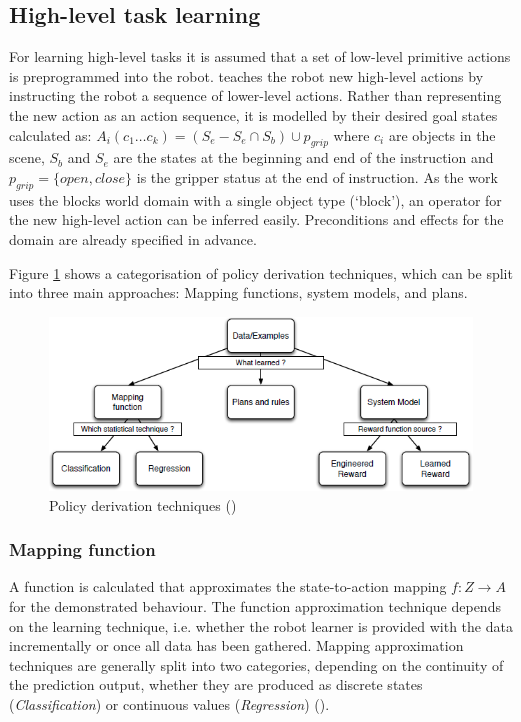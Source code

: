 \subsection{High-level task learning}
For learning high-level tasks it is assumed that a set of low-level primitive actions is preprogrammed into the robot. 
\cite{she2014teaching} teaches the robot new high-level actions by instructing the robot a sequence of lower-level actions.
Rather than representing the new action as an action sequence, it is modelled by their desired goal states calculated as:
$A_i(c_1 \dots c_k) = (S_e - S_e \cap S_b) \cup p_{grip}$ where $c_i$ are objects in the scene, $S_b$ and $S_e$ are the states at the beginning and end of the instruction and $p_{grip} = \{open, close\}$ is the gripper status at the end of instruction.
As the work uses the blocks world domain with a single object type (`block'), an operator for the new high-level action can be inferred easily. Preconditions and effects for the domain are already specified in advance.

Figure \ref{fig:Learning-techniques} shows a categorisation of policy derivation techniques, which can be split into three main approaches: Mapping functions, system models, and plans.

\begin{figure}[!h]
	\centering
	\includegraphics[scale=0.75]{figures/Learning-techniques}
	\caption{Policy derivation techniques (\cite{argall2009survey})}
	\label{fig:Learning-techniques}
\end{figure}


\subsubsection{Mapping function} 
A function is calculated that approximates the state-to-action mapping $f : Z \rightarrow A$ for the demonstrated behaviour. The function approximation technique depends on the learning technique, i.e. whether the robot learner is provided with the data incrementally or once all data has been gathered. Mapping approximation techniques are generally split into two categories, depending on the continuity of the prediction output, whether they are produced as discrete states (\textit{Classification}) or continuous values (\textit{Regression}) (\cite{argall2009survey}).

